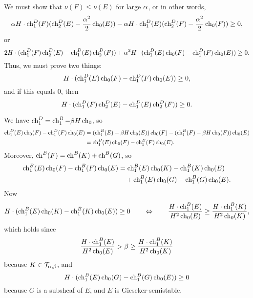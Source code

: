 \documentclass[letterpaper,10pt]{article}
\begin{document}
We must show that $\nu(F) \le \nu(E)$ for large $\al$, or in other words,
\[ \al H\cdot \ch_1^D(F) (\ch_2^D(E) - \frac{\al^2}{2}\ch_0(E)) - \al H\cdot \ch_1^D(E) (\ch_2^D(F) - \frac{\al^2}{2}\ch_0(F)) \ge 0, \]
or
\[ 2 H\cdot (\ch_1^D(F) \ch_2^D(E) - \ch_1^D(E) \ch_2^D(F)) + \al^2 H \cdot (\ch_1^D(E) \ch_0(F) - \ch_1^D(F) \ch_0(E)) \ge 0. \]
Thus, we must prove two things: 
\[ H \cdot (\ch_1^D(E) \ch_0(F) - \ch_1^D(F) \ch_0(E)) \ge 0, \]
and if this equals 0, then
\[ H \cdot (\ch_1^D(F) \ch_2^D(E) - \ch_1^D(E) \ch_2^D(F)) \ge 0. \] 

We have $\ch_1^D = \ch_1^B - \be H \ch_0$, so
\begin{align*}
    \ch_1^D(E) \ch_0(F) - \ch_1^D(F) \ch_0(E) & = (\ch_1^B(E) - \be H \ch_0(E))\ch_0(F) - (\ch_1^B(F) - \be H \ch_0(F))\ch_0(E) \\
    & = \ch_1^B(E) \ch_0(F) - \ch_1^B(F) \ch_0(E).
\end{align*} 
Moreover, $\ch^B(F) = \ch^B(K) + \ch^B(G)$, so
\begin{align*}
    \ch_1^B(E) \ch_0(F) - \ch_1^B(F) \ch_0(E) & = \ch_1^B(E) \ch_0(K) - \ch_1^B(K) \ch_0(E) \\
    & \quad + \ch_1^B(E) \ch_0(G) - \ch_1^B(G) \ch_0(E).
\end{align*}
Now
\[ H \cdot (\ch_1^B(E) \ch_0(K) - \ch_1^B(K) \ch_0(E)) \ge 0 \qquad \Leftrightarrow \qquad \frac{H \cdot \ch_1^B(E)}{H^2 \ch_0(E)} \ge \frac{H \cdot \ch_1^B(K)}{H^2 \ch_0(K)}, \]
which holds since
\[ \frac{H \cdot \ch_1^B(E)}{H^2 \ch_0(E)} > \be \ge \frac{H \cdot \ch_1^B(K)}{H^2 \ch_0(K)} \]
because $K \in \sT_{\al,\be}$, and
\[ H \cdot (\ch_1^B(E) \ch_0(G) - \ch_1^B(G) \ch_0(E)) \ge 0 \]
because $G$ is a subsheaf of $E$, and $E$ is Gieseker-semistable.
\end{document}
